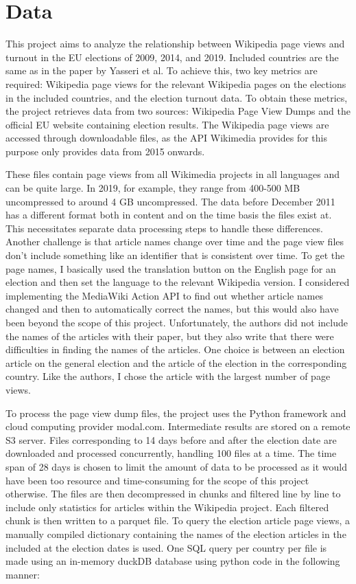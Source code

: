 \chapter{Data}
\label{sec:data}
This project aims to analyze the relationship between Wikipedia page views and turnout in the EU elections of 2009, 2014, and 2019. Included countries are the same as in the paper by Yasseri et al. To achieve this, two key metrics are required: Wikipedia page views for the relevant Wikipedia pages on the elections in the included countries, and the election turnout data. To obtain these metrics, the project retrieves data from two sources: Wikipedia Page View Dumps and the official EU website containing election results. The Wikipedia page views are accessed through downloadable files, as the API Wikimedia provides for this purpose only provides data from 2015 onwards. 

These files contain page views from all Wikimedia projects in all languages and can be quite large. In 2019, for example, they range from 400-500 MB uncompressed to around 4 GB uncompressed. The data before December 2011 has a different format both in content and on the time basis the files exist at. This necessitates separate data processing steps to handle these differences. Another challenge is that article names change over time and the page view files don't include something like an identifier that is consistent over time. To get the page names, I basically used the translation button on the English page for an election and then set the language to the relevant Wikipedia version. I considered implementing the MediaWiki Action API to find out whether article names changed and then to automatically correct the names, but this would also have been beyond the scope of this project. Unfortunately, the authors did not include the names of the articles with their paper, but they also write that there were difficulties in finding the names of the articles. One choice is between an election article on the general election and the article of the election in the corresponding country. Like the authors, I chose the article with the largest number of page views.

To process the page view dump files, the project uses the Python framework and cloud computing provider modal.com. Intermediate results are stored on a remote S3 server.  Files corresponding to 14 days before and after the election date are downloaded and processed concurrently, handling 100 files at a time. The time span of 28 days is chosen to limit the amount of data to be processed as it would have been too resource and time-consuming for the scope of this project otherwise. The files are then decompressed in chunks and filtered line by line to include only statistics for articles within the Wikipedia project. Each filtered chunk is then written to a parquet file. To query the election article page views, a manually compiled dictionary containing the names of the election articles in the included at the election dates is used. One SQL query per country per file is made using an in-memory duckDB database using python code in the following manner:

